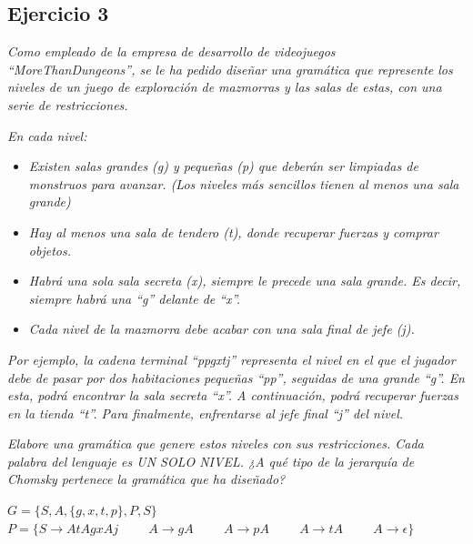 \newpage

\subsection{Ejercicio 3}

\textit{Como empleado de la empresa de desarrollo de videojuegos “MoreThanDungeons”, se le ha pedido diseñar una gramática que represente los niveles de un juego de exploración de mazmorras y las salas de estas, con una serie de restricciones.} \newline

\textit{En cada nivel:} 

\begin{itemize}

	\item \textit{Existen salas grandes (g) y pequeñas (p) que deberán ser limpiadas de monstruos para avanzar. (Los niveles más sencillos tienen al menos una sala grande)}
	\item \textit{Hay al menos una sala de tendero (t), donde recuperar fuerzas y comprar objetos.}
	\item \textit{Habrá una sola sala secreta (x), siempre le precede una sala grande. Es decir, siempre habrá una “g” delante de “x”.}
	\item \textit{Cada nivel de la mazmorra debe acabar con una sala final de jefe (j).}
\end{itemize}

\textit{Por ejemplo, la cadena terminal “ppgxtj” representa el nivel en el que el jugador debe de pasar por dos habitaciones pequeñas “pp”, seguidas de una grande “g”. En esta, podrá encontrar la sala secreta “x”. A continuación, podrá recuperar fuerzas en la tienda “t”. Para finalmente, enfrentarse al jefe final “j” del nivel.} \newline

\textit{Elabore una gramática que genere estos niveles con sus restricciones. Cada palabra del lenguaje es UN SOLO NIVEL. ¿A qué tipo de la jerarquía de Chomsky pertenece la gramática que ha diseñado?} \newline

$ G = \{S,  A, \{ g,x,t,p \} ,P,S\} $ \newline
$ P = \{ S \rightarrow AtAgxAj \hspace{1cm} A \rightarrow gA \hspace{1cm} A \rightarrow pA \hspace{1cm} A \rightarrow tA \hspace{1cm} A \rightarrow \epsilon \} $ \newline

